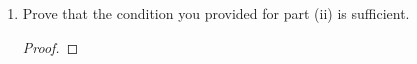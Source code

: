 \documentclass[../psets.tex]{subfiles}
\begin{document}
\begin{enumerate}
\begin{enumerate}
\begin{proof}
            Let $a=p_1^{e_1}\cdots p_n^{e_n}$ and $b=p_1^{f_1}\cdots p_n^{f_n}$. Then a necessary and sufficient condition for the uniqueness of $\phi$ is that
            \begin{equation*}
                \boxed{e_i \neq f_i\ \forall\ i=1,\dots,n}
            \end{equation*}
        \end{proof}
        \item Prove that the condition you provided for part (ii) is sufficient.
        \begin{proof}




\end{proof}
\end{enumerate}
\end{enumerate}
\end{document}
